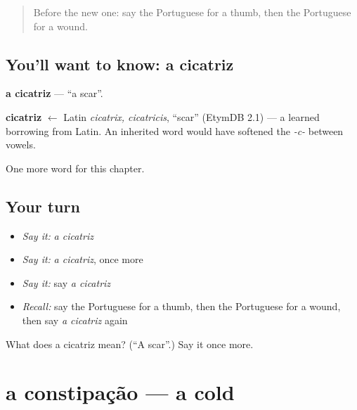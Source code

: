 \label{lesson:PT-C180-cicatriz}



\begin{quote}
Before the new one: say the Portuguese for a thumb, then the Portuguese for a wound.
\end{quote}

\subsection*{You'll want to know: a cicatriz}
\textbf{a cicatriz} — \textquotedblleft{}a scar\textquotedblright{}.

\begin{cousinweb}
\textbf{cicatriz} $\leftarrow$ Latin \emph{cicatrix, cicatricis}, \textquotedblleft{}scar\textquotedblright{} (EtymDB 2.1) — a learned borrowing from Latin. An inherited word would have softened the \emph{-c-} between vowels.
\end{cousinweb}

\begin{grammarlens}[title={What you've built}]
One more word for this chapter.
\end{grammarlens}

\subsection*{Your turn}
\begin{itemize}
\raggedright
  \item \emph{Say it:} \emph{a cicatriz}
  \item \emph{Say it:} \emph{a cicatriz}, once more
  \item \emph{Say it:} say \emph{a cicatriz}
  \item \emph{Recall:} say the Portuguese for a thumb, then the Portuguese for a wound, then say \emph{a cicatriz} again
\end{itemize}

\begin{tcolorbox}[breakable,colback=teal!4,colframe=teal!35!black,title={Before you move on}]
What does a cicatriz mean? (\textquotedblleft{}A scar\textquotedblright{}.) Say it once more.
\end{tcolorbox}
\section[a constipação]{a constipação — a cold}

\label{lesson:PT-C180-constipacao}



